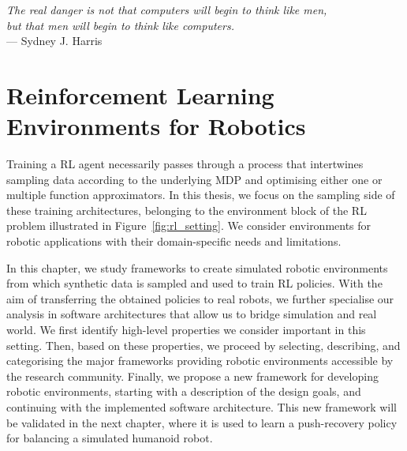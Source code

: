 \begin{flushright}
    \textsl{
    The real danger is not that computers will begin to think like men,\\
    but that men will begin to think like computers.
    }\\
    --- Sydney J. Harris
\end{flushright}

\chapter{Reinforcement Learning Environments for Robotics}
\label{ch:rl_env_for_robotics}

Training a \ac{RL} agent necessarily passes through a process that intertwines sampling data according to the underlying \ac{MDP} and optimising either one or multiple function approximators.
In this thesis, we focus on the sampling side of these training architectures, belonging to the environment block of the \ac{RL} problem illustrated in Figure~\ref{fig:rl_setting}.
We consider environments for robotic applications with their domain-specific needs and limitations.

In this chapter, we study frameworks to create simulated robotic environments from which synthetic data is sampled and used to train \ac{RL} policies.
With the aim of transferring the obtained policies to real robots, we further specialise our analysis in software architectures that allow us to bridge simulation and real world.
We first identify high-level properties we consider important in this setting.
Then, based on these properties, we proceed by selecting, describing, and categorising the major frameworks providing robotic environments accessible by the research community.
Finally, we propose a new framework for developing robotic environments, starting with a description of the design goals, and continuing with the implemented software architecture.
This new framework will be validated in the next chapter, where it is used to learn a push-recovery policy for balancing a simulated humanoid robot.

